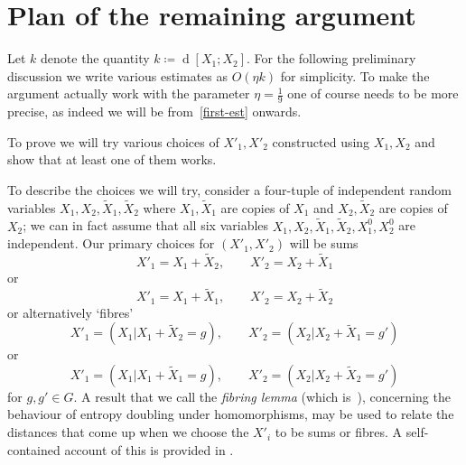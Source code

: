 \documentclass[12pt,reqno,tbtags]{amsart}
\theoremstyle{definition}
\theoremstyle{remark}
\newcommand{\dist}[2]{{\operatorname{d}[#1;#2]}} %
\numberwithin{equation}{section}
\begin{document}
\section{Plan of the remaining argument}%
\label{sec3}

Let $k$ denote the quantity $k \coloneqq \dist{X_1}{X_2}$.
For the following preliminary discussion we write various estimates as $O(\eta k)$ for simplicity. To make the argument actually work with the parameter $\eta = \frac{1}{9}$ one of course needs to be more precise, as indeed we will be from~\eqref{first-est} onwards.

To prove  we will try various choices of $X'_1, X'_2$ constructed using $X_1, X_2$ and show that at least one of them works.


To describe the choices we will try, consider a four-tuple of independent random variables $X_1, X_2, \tilde X_1, \tilde X_2$ where $X_1,\tilde X_1$ are copies of $X_1$ and $X_2,\tilde X_2$ are copies of $X_2$; we can in fact assume that all six variables $X_1,X_2,\tilde X_1,\tilde X_2,X^0_1,X^0_2$ are independent. Our primary choices for $(X'_1, X'_2)$ will be sums
\begin{equation}
  \label{sum-1}
  X'_1 = X_1 + \tilde X_2,\qquad X'_2 = X_2 + \tilde X_1
\end{equation}
or
\begin{equation}
  \label{sum-2}
  X'_1 = X_1 + \tilde X_1,\qquad X'_2 = X_2 + \tilde X_2
\end{equation}
or alternatively  `fibres'
\begin{equation}
  \label{fiber-1}
  X'_1 = (X_1 | X_1 + \tilde X_2= g),\qquad X'_2 = (X_2 | X_2 + \tilde X_1 = g')
\end{equation}
or
\begin{equation}
  \label{fiber-2}
  X'_1 = (X_1 | X_1 + \tilde X_1= g),\qquad X'_2 = (X_2 | X_2 + \tilde X_2 = g')
\end{equation}
for $g, g' \in G$.
A result that we call the \emph{fibring lemma} (which is~\cite[Proposition 1.4]{gmt}), concerning the behaviour of entropy doubling under homomorphisms, may be used to relate the distances that come up when we choose the $X'_i$ to be sums or fibres.
A self-contained account of this is provided in .
\end{document}
